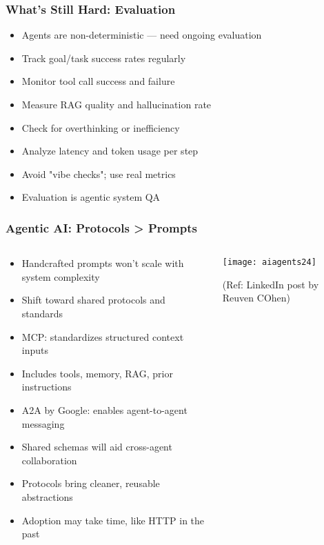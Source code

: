 \begin{frame}[fragile]\frametitle{What’s Still Hard: Evaluation}

      \begin{itemize}
        \item Agents are non-deterministic — need ongoing evaluation
        \item Track goal/task success rates regularly
        \item Monitor tool call success and failure
        \item Measure RAG quality and hallucination rate
        \item Check for overthinking or inefficiency
        \item Analyze latency and token usage per step
        \item Avoid "vibe checks"; use real metrics
        \item Evaluation is agentic system QA
      \end{itemize}

\end{frame}

\begin{frame}[fragile]\frametitle{Agentic AI: Protocols > Prompts}
\begin{columns}
    \begin{column}[T]{0.6\linewidth}
      \begin{itemize}
        \item Handcrafted prompts won't scale with system complexity
        \item Shift toward shared protocols and standards
        \item MCP: standardizes structured context inputs
        \item Includes tools, memory, RAG, prior instructions
        \item A2A by Google: enables agent-to-agent messaging
        \item Shared schemas will aid cross-agent collaboration
        \item Protocols bring cleaner, reusable abstractions
        \item Adoption may take time, like HTTP in the past
      \end{itemize}
    \end{column}
    \begin{column}[T]{0.4\linewidth}
        \begin{center}
        \texttt{[image: aiagents24]}
		
		{\tiny (Ref: LinkedIn post by Reuven COhen)}
        \end{center}	
    \end{column}
\end{columns}
\end{frame}

